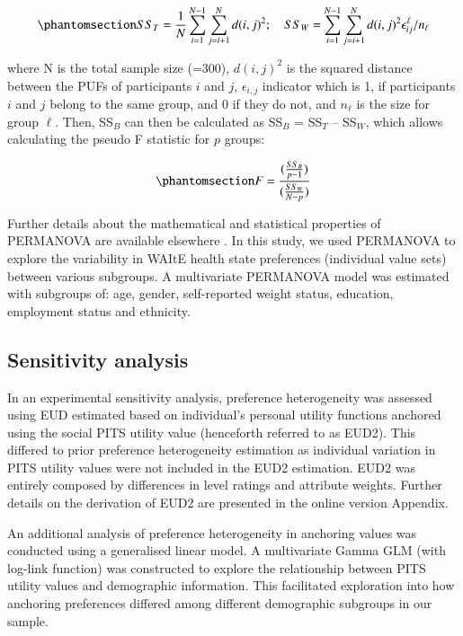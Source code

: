 \documentclass[
  number,
  preprint]{elsarticle}
\begin{document}
\begin{equation}\phantomsection\label{eq-sumsquares}{ 
    SS_{T} = \frac{1}{N}\sum_{i=1}^{N-1}\sum_{j=i+1}^{N}d(i,j)^{2}; \quad SS_{W} = \sum_{i=1}^{N-1}\sum_{j=i+1}^{N}d(i,j)^{2}\epsilon_{ij}^{\ell}/n_{\ell}
}\end{equation}

where N is the total sample size (=300), \(d(i,j)^2\) is the squared
distance between the PUFs of participants \(i\) and \(j\),
\(\epsilon_{i,j}\) indicator which is 1, if participants \(i\) and \(j\)
belong to the same group, and 0 if they do not, and \(n_{\ell}\) is the
size for group \(\ell\). Then, SS\(_B\) can then be calculated as
SS\(_B\) = SS\(_T\) -- SS\(_W\), which allows calculating the pseudo F
statistic for \(p\) groups:

\begin{equation}\phantomsection\label{eq-ssb}{
F= \frac{(\frac{SS_B}{p-1})}{(\frac{SS_W}{N-p})}
}\end{equation}

Further details about the mathematical and statistical properties of
PERMANOVA are available elsewhere
\citep{Schneider2024ExploringLevel, Anderson2017, Anderson2013PERMANOVATesting}.
In this study, we used PERMANOVA to explore the variability in WAItE
health state preferences (individual value sets) between various
subgroups. A multivariate PERMANOVA model was estimated with subgroups
of: age, gender, self-reported weight status, education, employment
status and ethnicity.

\subsection{Sensitivity analysis}\label{sensitivity-analysis}

In an experimental sensitivity analysis, preference heterogeneity was
assessed using EUD estimated based on individual's personal utility
functions anchored using the social PITS utility value (henceforth
referred to as EUD2). This differed to prior preference heterogeneity
estimation as individual variation in PITS utility values were not
included in the EUD2 estimation. EUD2 was entirely composed by
differences in level ratings and attribute weights. Further details on
the derivation of EUD2 are presented in the online version Appendix.

An additional analysis of preference heterogeneity in anchoring values
was conducted using a generalised linear model. A multivariate Gamma GLM
(with log-link function) was constructed to explore the relationship
between PITS utility values and demographic information. This
facilitated exploration into how anchoring preferences differed among
different demographic subgroups in our sample.
\end{document}
